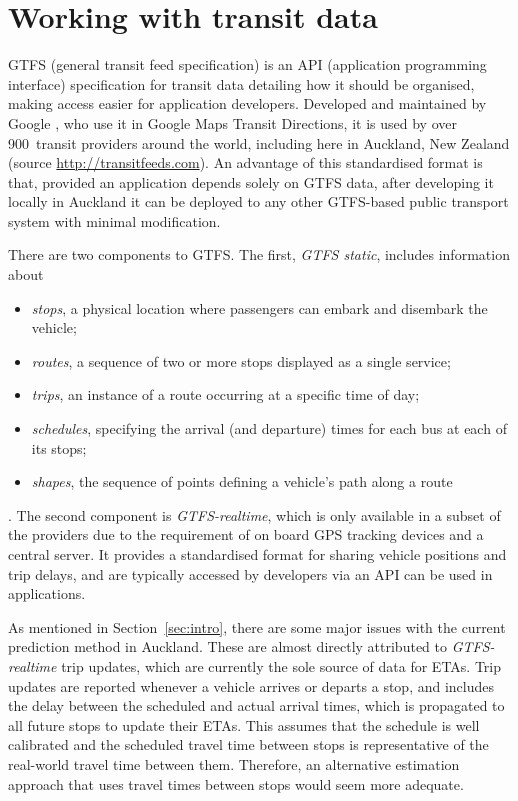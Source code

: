 \section{Working with \rt transit data}
\label{sec:gtfs}

GTFS (general transit feed specification)
is an API (application programming interface) specification for transit data
detailing how it should be organised,
making access easier for application developers.
Developed and maintained by Google \citep{GoogleDevelopers_2006},
who use it in Google Maps Transit Directions,
it is used by over 900~transit providers around the world,
including here in Auckland, New Zealand
(source \url{http://transitfeeds.com}).
An advantage of this standardised format is that,
provided an application depends solely on GTFS data,
after developing it locally in Auckland it can be deployed to any other GTFS-based
public transport system with minimal modification.


There are two components to GTFS.
The first, \emph{GTFS static}, includes information about
\begin{itemize}
\item \emph{stops}, a physical location where passengers can embark and disembark the vehicle;
\item \emph{routes}, a sequence of two or more stops displayed as a single service;
\item \emph{trips}, an instance of a route occurring at a specific time of day;
\item \emph{schedules}, specifying the arrival (and departure) times for each bus at each of its stops; 
\item \emph{shapes}, the sequence of points defining a vehicle's path along a route
\end{itemize}
\citep{GoogleDevelopers_2006}.
The second component is \emph{GTFS-realtime},
which is only available in a subset of the providers due to the requirement of 
on board GPS tracking devices and a central server.
It provides a standardised format for sharing vehicle positions and trip delays,
and are typically accessed by developers via an API can be used in \rt applications.

As mentioned in Section~\ref{sec:intro},
there are some major issues with the current prediction method in Auckland.
These are almost directly attributed to \emph{GTFS-realtime} trip updates,
which are currently the sole source of data for ETAs.
Trip updates are reported whenever a vehicle arrives or departs a stop,
and includes the delay between the scheduled and actual arrival times,
which is propagated to all future stops to update their ETAs.
This assumes that the schedule is well calibrated 
and the scheduled travel time between stops
is representative of the real-world travel time between them. 
Therefore, an alternative estimation approach that uses \rt travel times 
between stops would seem more adequate.



